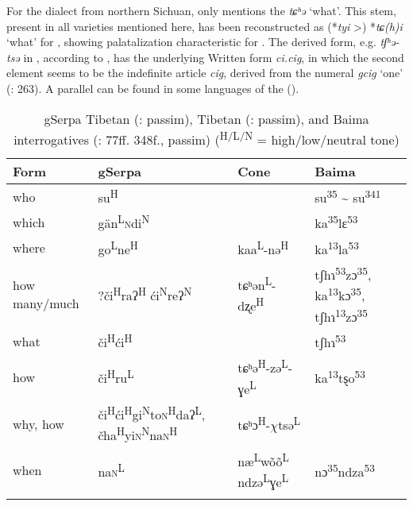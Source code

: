 For the  dialect from northern Sichuan, \citet{Sun2006} only mentions the  \textit{tɕʰ}\textit{ə} ‘what’. This  stem, present in all varieties mentioned here, has been reconstructed as (*\textit{tyi} >) *\textit{tɕ(h)i} ‘what’ for , showing palatalization characteristic for  \citep[114]{Tournadre2014}. The derived form, e.g. \textit{tʃʰ}\textit{ə-tsə} in , according to \citet[831]{Sun2003a}, has the underlying Written  form \textit{ci.cig}, in which the second element seems to be the indefinite article \textit{cig}, derived from the numeral \textit{gcig} ‘one’ (\citealt{DeLancey2003}: 263). A parallel can be found in some  languages of the  ().

\begin{table}
\caption{gSerpa Tibetan (\citealt{Nagano1980}: passim),  Tibetan (\citealt{Jacques2014}: passim), and Baima interrogatives (\citealt{Sun1996}: 77ff. 348f., passim) (\textsuperscript{H/L/N} = high/low/neutral tone)}
\label{tab:trans:12}
\begin{tabularx}{\textwidth}{lQlQ}
\lsptoprule

\textbf{Form} & \textbf{gSerpa} & \textbf{Cone} & \textbf{Baima}\\
\midrule
who & su\textsuperscript{H} &  & su\textsuperscript{35} {\textasciitilde} su\textsuperscript{341}\\
which & gän\textsuperscript{L}\textsc{n}di\textsuperscript{N} &  & ka\textsuperscript{35}lɛ\textsuperscript{53}\\
where & go\textsuperscript{L}ne\textsuperscript{H} & kaa\textsuperscript{L}-nə\textsuperscript{H} & ka\textsuperscript{13}la\textsuperscript{53}\\
how many/much & ?či\textsuperscript{H}raʔ\textsuperscript{H} ći\textsuperscript{N}reʔ\textsuperscript{N} & tɕʰən\textsuperscript{L}-dʐe\textsuperscript{H} & tʃhɿ\textsuperscript{53}zɔ\textsuperscript{35},\newline
	  ka\textsuperscript{13}kɔ\textsuperscript{35},\newline
	  tʃhɿ\textsuperscript{13}zɔ\textsuperscript{35}\\
what & či\textsuperscript{H}ći\textsuperscript{H} &  & tʃhɿ\textsuperscript{53}\\
how & či\textsuperscript{H}ru\textsuperscript{L} & tɕʰə\textsuperscript{H}-zə\textsuperscript{L}-ɣe\textsuperscript{L} & ka\textsuperscript{13}tȿo\textsuperscript{53}\\
why, how & či\textsuperscript{H}ći\textsuperscript{H}gi\textsuperscript{N}to\textsc{n}\textsuperscript{H}daʔ\textsuperscript{L}, čha\textsuperscript{H}yi\textsc{n}\textsuperscript{N}na\textsc{n}\textsuperscript{H} & tɕʰɔ\textsuperscript{H}-$\chi $tsə\textsuperscript{L} & \\
when & na\textsc{n}\textsuperscript{L} & næ\textsuperscript{L}wõõ\textsuperscript{L} ndzə\textsuperscript{L}ɣe\textsuperscript{L} & nɔ\textsuperscript{35}ndza\textsuperscript{53}\\
\lspbottomrule
\end{tabularx}
\end{table}

